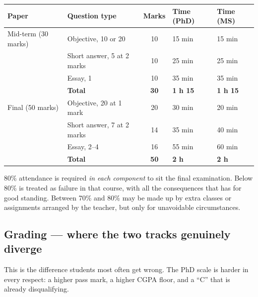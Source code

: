 \begin{center}
\small
\begin{tabular}{@{}L{4.2cm}L{3.3cm}cL{2.2cm}L{2.2cm}@{}}
\toprule
\textbf{Paper} & \textbf{Question type} & \textbf{Marks} & \textbf{Time (PhD)} & \textbf{Time (MS)} \\
\midrule
Mid-term (30 marks) & Objective, 10 or 20 & 10 & 15 min & 15 min \\
                    & Short answer, 5 at 2 marks & 10 & 25 min & 25 min \\
                    & Essay, 1 & 10 & 35 min & 35 min \\
\addlinespace
                    & \textbf{Total} & \textbf{30} & \textbf{1 h 15} & \textbf{1 h 15} \\
\midrule
Final (50 marks)    & Objective, 20 at 1 mark & 20 & 30 min & 20 min \\
                    & Short answer, 7 at 2 marks & 14 & 35 min & 40 min \\
                    & Essay, 2--4 & 16 & 55 min & 60 min \\
\addlinespace
                    & \textbf{Total} & \textbf{50} & \textbf{2 h} & \textbf{2 h} \\
\bottomrule
\end{tabular}
\end{center}

\begin{regbox}
80\% attendance is required \emph{in each component} to sit the final
examination. Below 80\% is treated as failure in that course, with all the
consequences that has for good standing. Between 70\% and 80\% may be made up
by extra classes or assignments arranged by the teacher, but only for
unavoidable circumstances.
\end{regbox}

\subsection*{Grading --- where the two tracks genuinely diverge}

This is the difference students most often get wrong. The PhD scale is harder
in every respect: a higher pass mark, a higher CGPA floor, and a ``C'' that is
already disqualifying.


